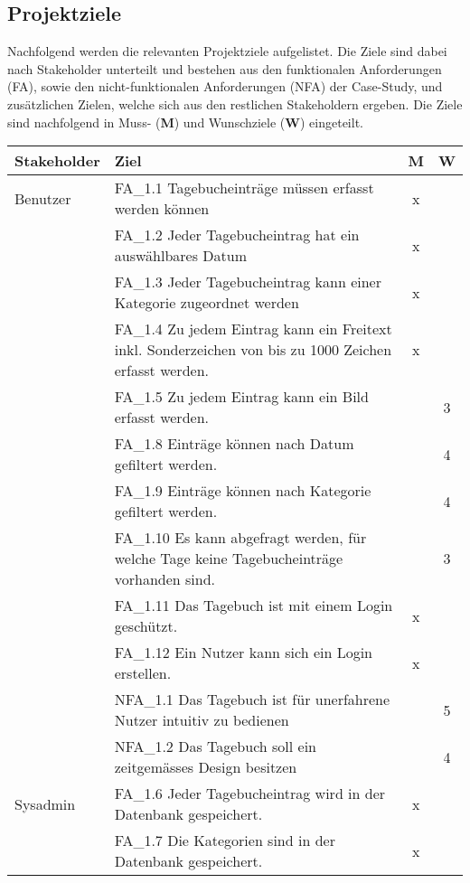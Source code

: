 \subsection{Projektziele}
Nachfolgend werden die relevanten Projektziele aufgelistet. Die Ziele sind dabei nach Stakeholder unterteilt und bestehen aus den funktionalen Anforderungen (FA), sowie den nicht-funktionalen Anforderungen (NFA) der Case-Study, und zusätzlichen Zielen, welche sich aus den restlichen Stakeholdern ergeben.
Die Ziele sind nachfolgend in Muss- (\textbf{M}) und Wunschziele (\textbf{W}) eingeteilt.

\vspace{5mm}

\begin{longtable}{ p{2.2cm}|p{10cm}|c|c  }
    \textbf{Stakeholder} & \textbf{Ziel} & \textbf{M} & \textbf{W} \\
    \hline
    Benutzer & FA\_1.1 Tagebucheinträge müssen erfasst werden können & x & \\
    & FA\_1.2 Jeder Tagebucheintrag hat ein auswählbares Datum & x & \\
    & FA\_1.3 Jeder Tagebucheintrag kann einer Kategorie zugeordnet werden & x & \\
    & FA\_1.4 Zu jedem Eintrag kann ein Freitext inkl. Sonderzeichen von bis zu 1000 Zeichen erfasst werden. & x & \\
    & FA\_1.5 Zu jedem Eintrag kann ein Bild erfasst werden. & & 3 \\
    & FA\_1.8 Einträge können nach Datum gefiltert werden. & & 4 \\
    & FA\_1.9 Einträge können nach Kategorie gefiltert werden. & & 4 \\
    & FA\_1.10 Es kann abgefragt werden, für welche Tage keine Tagebucheinträge vorhanden sind. & & 3 \\
    & FA\_1.11 Das Tagebuch ist mit einem Login geschützt. & x & \\
    & FA\_1.12 Ein Nutzer kann sich ein Login erstellen. & x & \\
    & NFA\_1.1 Das Tagebuch ist für unerfahrene Nutzer intuitiv zu bedienen & & 5 \\
    & NFA\_1.2 Das Tagebuch soll ein zeitgemässes Design besitzen & & 4 \\
    Sysadmin & FA\_1.6 Jeder Tagebucheintrag wird in der Datenbank gespeichert. &x & \\
    & FA\_1.7 Die Kategorien sind in der Datenbank gespeichert. & x& \\

\end{longtable}
